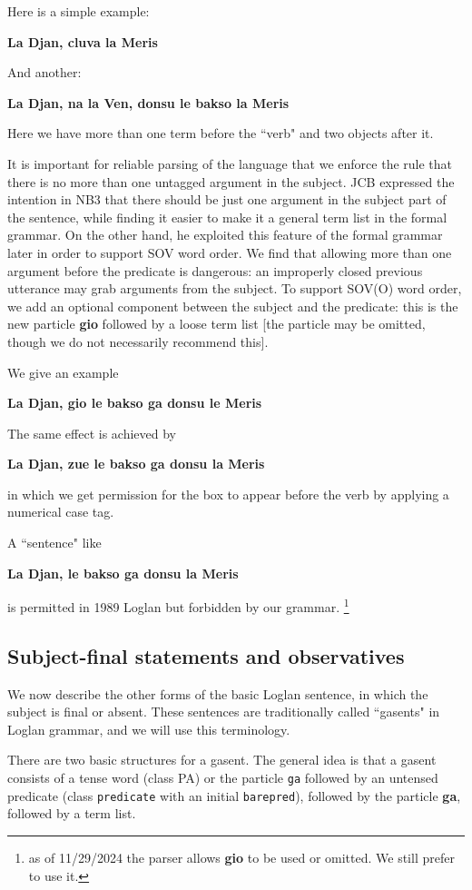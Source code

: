 \documentclass[12pt]{book}
\begin{document}
{Here is a simple example:

{\bf La Djan, cluva la Meris}

And another:

{\bf La Djan, na la Ven, donsu le bakso la Meris}

Here we have more than one term before the ``verb" and two objects after it.

It is important for reliable parsing of the language that we enforce the rule that there is no more than one untagged argument in the subject.  JCB
expressed the intention in NB3 that there should be just one argument in the subject part of the sentence, while finding it easier to make it a general term list in the formal  grammar.  On the other hand, he exploited this feature of the formal grammar  later in order to support SOV word order.  We find that allowing more than one argument
before the predicate is dangerous:  an improperly closed previous utterance may grab arguments from the subject.  To support SOV(O) word order,
we add an optional component between the subject and the predicate:  this is the new particle {\bf gio} followed by a loose term list [the particle may be omitted, though we do not necessarily recommend this].

We give an example

{\bf La Djan, gio le bakso ga donsu le Meris}

The same effect is achieved by

{\bf La Djan, zue le bakso ga donsu la Meris}

in which we get permission for the box to appear before the verb by applying a numerical case tag.

A ``sentence" like

{\bf*La Djan, le bakso ga donsu la Meris}

is permitted in 1989 Loglan but forbidden by our grammar. \footnote{as of 11/29/2024 the parser allows {\bf gio} to be used or omitted.  We still prefer to use it.}

\subsection{Subject-final statements and observatives}

We now describe the other forms of the basic Loglan sentence, in which the subject is final or absent.  These sentences are traditionally called
``gasents" in Loglan grammar, and we will use this terminology.

There are two basic structures for a gasent.  The general idea is that a gasent consists of a tense word (class PA) or the particle {\tt ga} followed by an untensed predicate  (class {\tt predicate} with an initial {\tt barepred}), followed by the particle {\bf ga}, followed by a term list.  

}
\end{document}
